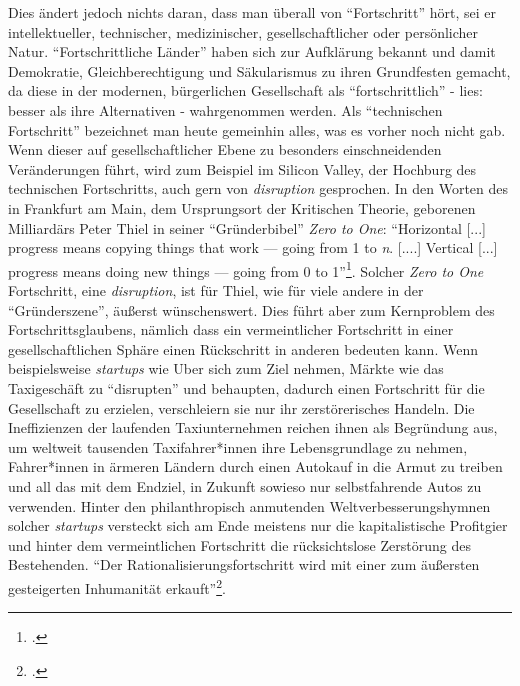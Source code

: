 \documentclass[a4paper, 12pt]{article}
\begin{document}
\begin{onehalfspace}
Dies ändert jedoch nichts daran, dass man überall von "`Fortschritt"' hört, sei er intellektueller, technischer, medizinischer, gesellschaftlicher oder persönlicher Natur. "`Fortschrittliche Länder"' haben sich zur Aufklärung bekannt und damit Demokratie, Gleichberechtigung und Säkularismus zu ihren Grundfesten gemacht, da diese in der modernen, bürgerlichen Gesellschaft als "`fortschrittlich"' - lies: besser als ihre Alternativen - wahrgenommen werden. Als "`technischen Fortschritt"' bezeichnet man heute gemeinhin alles, was es vorher noch nicht gab. Wenn dieser auf gesellschaftlicher Ebene zu besonders einschneidenden Veränderungen führt, wird zum Beispiel im Silicon Valley, der Hochburg des technischen Fortschritts, auch gern von \emph{disruption} gesprochen. In den Worten des in Frankfurt am Main, dem Ursprungsort der Kritischen Theorie, geborenen Milliardärs Peter Thiel in seiner "`Gründerbibel"' \emph{Zero to One}: "`Horizontal [...] progress means copying things that work — going from 1 to \emph{n}. [....] Vertical [...] progress means doing new things — going from 0 to 1"'\footnote{\Cite[Siehe][S. 6]{thiel}.}. Solcher \emph{Zero to One} Fortschritt, eine \emph{disruption}, ist für Thiel, wie für viele andere in der "`Gründerszene"', äußerst wünschenswert. Dies führt aber zum Kernproblem des Fortschrittsglaubens, nämlich dass ein vermeintlicher Fortschritt in einer gesellschaftlichen Sphäre einen Rückschritt in anderen bedeuten kann. Wenn beispielsweise \emph{startups} wie Uber sich zum Ziel nehmen, Märkte wie das Taxigeschäft zu "`disrupten"' und behaupten, dadurch einen Fortschritt für die Gesellschaft zu erzielen, verschleiern sie nur ihr zerstörerisches Handeln. Die Ineffizienzen der laufenden Taxiunternehmen reichen ihnen als Begründung aus, um weltweit tausenden Taxifahrer*innen ihre Lebensgrundlage zu nehmen, Fahrer*innen in ärmeren Ländern durch einen Autokauf in die Armut zu treiben und all das mit dem Endziel, in Zukunft sowieso nur selbstfahrende Autos zu verwenden. Hinter den philanthropisch anmutenden Weltverbesserungshymnen solcher \emph{startups} versteckt sich am Ende meistens nur die kapitalistische Profitgier und hinter dem vermeintlichen Fortschritt die rücksichtslose Zerstörung des Bestehenden. "`Der Rationalisierungsfortschritt wird mit einer zum äußersten gesteigerten Inhumanität erkauft"'\footnote{\Cite[Siehe][S. 389]{hetzel2011adorno}.}.


\end{onehalfspace}
\end{document}
